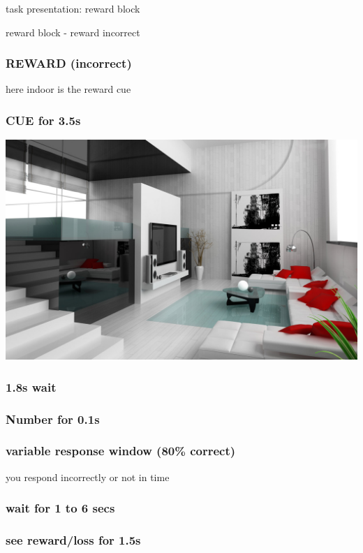 \documentclass{beamer}
\begin{document}
\begin{section}{task presentation: reward block}
\begin{subsection}{reward block - reward incorrect}
\begin{frame} \frametitle{REWARD (incorrect)} here indoor is the reward cue \end{frame}
\begin{frame} \frametitle{CUE for 3.5s}
   \begin{center}
	\includegraphics[width=.5\textwidth]{../imgs/Scenes/Indoors/living-room-interior-design.jpg} \\
   \end{center}
\end{frame}

\begin{frame} \frametitle{1.8s wait} \end{frame}
\begin{frame} \frametitle{Number for 0.1s}  \end{frame}
\begin{frame} \frametitle{variable response window (80\% correct)} \tiny{you respond incorrectly or not in time} \end{frame}
\begin{frame} \frametitle{wait for 1 to 6 secs} \end{frame}
\begin{frame} 
 \frametitle{see reward/loss for 1.5s}
   \begin{center}
     \center{\textcolor{red}{\huge{$\downarrow$}}}
   \end{center}
\end{frame}
\end{subsection}




\end{section}
\end{document}
